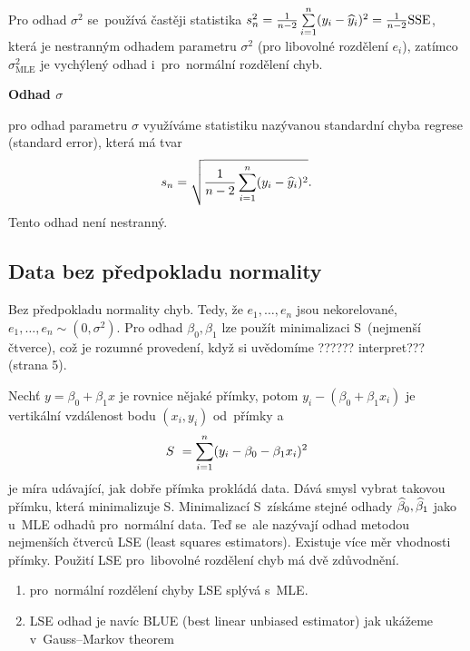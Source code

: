 \begin{remark}
Pro odhad $ \sigma^{2} $ se~používá častěji statistika $ s^{2}_{n} = \frac{1}{n - 2} \sum\limits_{i=1}^{n}(y_{i} -  \widehat{y}_{i})^{2} = \frac{1}{n-2} \text{SSE} $, která je nestranným odhadem parametru $ \sigma^{2} $ (pro libovolné rozdělení $ e_{i} $), zatímco $ \sigma^{2}_{\text{MLE}} $ je vychýlený odhad i~pro~normální rozdělení chyb.
\end{remark}
\textbf{Odhad $ \sigma $}

pro odhad parametru $ \sigma $ využíváme statistiku nazývanou standardní chyba regrese (standard error), která má tvar
$$
 s_{n} = \sqrt{\frac{1}{n-2} \sum\limits_{i=1}^{n}(y_{i} -  \widehat{y}_{i})^{2}}.
$$
Tento odhad není nestranný.

\subsection{Data bez předpokladu normality}
Bez předpokladu normality chyb. Tedy, že $ e_{1}, \dots , e_{n} $ jsou nekorelované, $ e_{1}, \dots , e_{n} \sim (0,\sigma^{2}) $.
Pro odhad $ \beta_{0}, \beta_{1} $ lze použít minimalizaci S~(nejmenší čtverce), což je rozumné provedení, když si uvědomíme ?????? interpret??? (strana 5).

Nechť $ y = \beta_{0} + \beta_{1} x  $ je rovnice nějaké přímky, potom $ y_{i} - (\beta_{0} + \beta_{1} x_{i}) $ je vertikální vzdálenost bodu $ (x_{i},y_{i}) $ od~přímky a~
$$
 S~= \sum\limits_{i=1}^{n} (y_{i} - \beta_{0} - \beta_{1} x_{i})^{2}
$$
je míra udávající, jak dobře přímka prokládá data. Dává smysl vybrat takovou přímku, která minimalizuje S. Minimalizací S~získáme stejné odhady $  \widehat{\beta}_{0}, \widehat{\beta}_{1} $ jako u~MLE odhadů pro~normální data. Teď se~ale nazývají odhad metodou nejmenších čtverců LSE (least squares estimators).
Existuje více měr vhodnosti přímky. Použití LSE pro~libovolné rozdělení chyb má dvě zdůvodnění.
\begin{enumerate}
  \item pro~normální rozdělení chyby LSE splývá s~MLE.
  \item LSE odhad je navíc BLUE (best linear unbiased estimator) jak ukážeme v~Gauss–Markov theorem
\end{enumerate}

